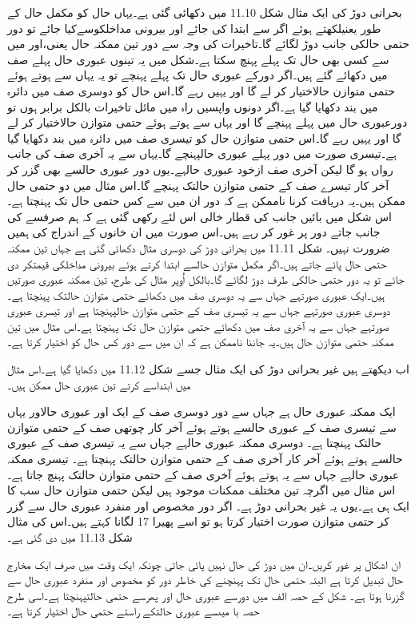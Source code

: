 	بحرانی دوڑ کی ایک مثال شکل 11.10 میں دکھائی گئی ہے۔یہاں حال کو مکمل حال کے طور یعنیلکھتے ہوئے اگر سے ابتدا کی جائے اور بیرونی مداخلکوسےکیا جائے تو دور حتمی حالکی جانب دوڑ لگائے گا۔تاخیرات کی وجہ سے دور تین ممکنہ حال  یعنی،اور میں سے کسی بھی حال تک پہلے پہنچ سکتا ہے۔شکل میں یہ تینوں عبوری حال پہلے صف میں دکھائے گئے ہیں۔اگر دورکے عبوری حال تک پہلے پہنچے تو یہ یہاں سے ہوتے ہوئے حتمی متوازن حالاختیار کر لے گا اور یہیں رہے گا۔اس حال کو دوسری صف میں دائرہ میں بند دکھایا گیا ہے۔اگر دونوں واپسیں راہ میں مائل تاخیرات بالکل برابر ہوں تو دورعبوری حال میں پہلے پہنچے گا اور یہاں سے ہوتے ہوئے حتمی متوازن حالاختیار کر لے گا اور یہیں رہے گا۔اس حتمی متوازن حال کو تیسری صف میں دائرہ میں بند دکھایا گیا ہے۔تیسری صورت میں دور پہلے عبوری حالپہنچے گا۔یہاں سے یہ آخری صف کی جانب رواں ہو گا لیکن آخری صف ازخود عبوری حالہے۔یوں دور عبوری حالسے بھی گزر کر آخر کار تیسرے صف کے حتمی متوازن حالتک پہنچے گا۔اس مثال میں دو حتمی حال ممکن ہیں۔یہ دریافت کرنا ناممکن ہے کہ دور ان میں سے کس حتمی حال تک پہنچتا ہے۔اس شکل میں بائیں جانب کی قطار خالی اس لئے رکھی گئی ہے کہ ہم صرفسے کی جانب جاتے دور پر غور کر رہے ہیں۔اس صورت میں ان خانوں کے اندراج کی ہمیں ضرورت نہیں۔
	شکل 11.11 میں بحرانی دوڑ کی دوسری مثال دکھائی گئی ہے جہاں تین ممکنہ حتمی حال پائے جاتے ہیں۔اگر مکمل متوازن حالسے ابتدا کرتے ہوئے بیرونی مداخلکی قیمتکر دی جائے تو یہ دور حتمی حالکی طرف دوڑ لگائے گا۔بالکل اُوپر مثال کی طرح، تین ممکنہ عبوری صورتیں ہیں۔ایک عبوری صورتہے جہاں سے یہ دوسری صف میں دکھائے حتمی متوازن حالتک پہنچتا ہے۔دوسری عبوری صورتہے جہاں سے یہ تیسری صف کے حتمی متوازن حالپہنچتا ہے اور تیسری عبوری صورتہے جہاں سے یہ آخری صف میں دکھائے حتمی متوازن حال تک پہنچتا ہے۔اس مثال میں تین ممکنہ حتمی متوازن حال ہیں۔یہ جاننا ناممکن ہے  کہ ان میں سے دور کس حال کو اختیار کرتا ہے۔


	اب دیکھتے ہیں غیر بحرانی دوڑ کی ایک مثال جسے شکل 11.12 میں دکھایا گیا ہے۔اس مثال میں ابتداسے کرتے تین عبوری حال ممکن ہیں۔


	ایک ممکنہ عبوری حال ہے جہاں سے دور دوسری صف کے ایک اور عبوری حالاور یہاں سے تیسری صف کے عبوری حالسے ہوتے ہوئے آخر کار  چوتھی صف کے حتمی متوازن حالتک پہنچتا ہے۔
	دوسری ممکنہ عبوری حالہے جہاں سے یہ تیسری صف کے عبوری حالسے ہوتے ہوئے آخر کار آخری صف کے حتمی متوازن حالتک پہنچتا ہے۔
	تیسری ممکنہ عبوری حالہے جہاں سے یہ ہوتے ہوئے آخری صف کے حتمی متوازن حالتک پہنچ جاتا ہے۔
	اس مثال میں اگرچہ تین مختلف ممکنات موجود ہیں لیکن حتمی متوازن حال سب کا ایک ہی ہے۔یوں یہ غیر بحرانی دوڑ ہے۔  
	اگر دور مخصوص اور منفرد عبوری حال  سے گزر کر حتمی متوازن صورت اختیار کرتا ہو تو اسے پھیرا 17 لگانا کہتے ہیں۔اس کی مثال شکل 11.13 میں دی گئی ہے۔ 


	ان اشکال پر غور کریں۔ان میں دوڑ کی حال نہیں پائی جاتی چونکہ ایک وقت میں صرف ایک مخارج حال تبدیل کرتا ہے البتہ حتمی حال تک پہنچنے کی خاطر دور کو مخصوص اور منفرد عبوری حال  سے گزرنا ہوتا ہے۔
	شکل کے حصہ الف میں دورسے عبوری حال اور پھرسے حتمی حالتپہنچتا ہے۔اسی طرح حصہ با میںسے   عبوری حالتکے راستے حتمی حال اختیار کرتا ہے۔

